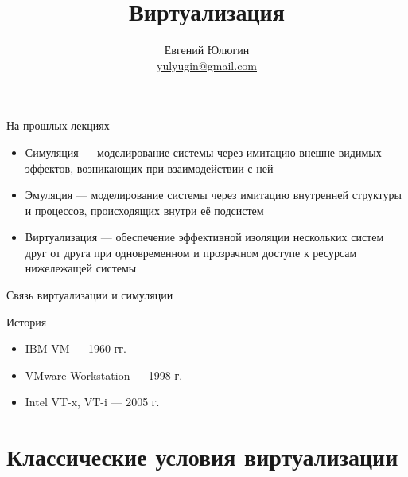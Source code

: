 
\title{Виртуализация}
\author[Евгений Юлюгин]{Евгений Юлюгин \\ \small{\href{mailto:yulyugin@gmail.com}{yulyugin@gmail.com}}}



\begin{frame}
\titlepage
\end{frame}

\begin{frame}
\tableofcontents
\end{frame}

\begin{frame}{На прошлых лекциях}
\begin{itemize}
\item Симуляция —  моделирование системы через имитацию внешне видимых эффектов, возникающих при взаимодействии с ней
\item Эмуляция — моделирование системы через имитацию внутренней структуры и процессов, происходящих внутри её подсистем
\item Виртуализация — обеспечение эффективной изоляции нескольких систем друг от друга при одновременном и прозрачном доступе к ресурсам нижележащей системы
\end{itemize}

\end{frame}

\begin{frame}{Связь виртуализации и симуляции}

\centering
{}

\vfill


\end{frame}

\begin{frame}{История}
\begin{itemize}
\item IBM VM — 1960 гг. \cite{goldberg}
\item VMware Workstation — 1998 г.
\item Intel VT-x, VT-i — 2005 г.
\end{itemize}


\end{frame}

\section{Классические условия виртуализации}

